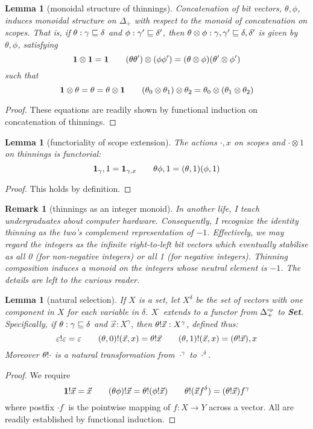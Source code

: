 \documentclass{jfp1}
\newtheorem{lemma}[theorem]{Lemma}
\newtheorem{remark}[theorem]{Remark}
\newcommand{\emp}{\varepsilon}
\newcommand{\Set}{\textbf{Set}}
\newcommand{\op}[1]{#1^{\mbox{\tiny op}}}
\begin{document}
\begin{lemma}[monoidal structure of thinnings]
  Concatenation of bit vectors, $\theta,\phi$, induces monoidal
  structure on $\Delta_+$ with respect to the monoid of concatenation
  on scopes. That is, if $\theta:\gamma\sqsubseteq\delta$ and
  $\phi:\gamma'\sqsubseteq\delta'$, then $\theta\otimes\phi :
  \gamma,\gamma'\sqsubseteq\delta,\delta'$
  is given by $\theta,\phi$, satisfying
  \[
    \mathbf{1}\otimes\mathbf{1} = \mathbf{1} \qquad
    (\theta\theta')\otimes(\phi\phi') =
     (\theta\otimes\phi)(\theta'\otimes\phi')
   \]
   such that
   \[
     \mathbf{1}\otimes\theta = \theta = \theta\otimes\mathbf{1}\qquad
     (\theta_0\otimes\theta_1)\otimes\theta_2 = \theta_0\otimes(\theta_1\otimes\theta_2)
   \]
\end{lemma}
\begin{proof}
  These equations are readily shown by functional induction on
  concatenation of thinnings.
\end{proof}

\begin{lemma}[functoriality of scope extension]
  The actions $\cdot,x$ on scopes and $\cdot\otimes1$ on thinnings is functorial:
  \[
    \mathbf{1}_\gamma,1 = \mathbf{1}_{\gamma,x}\qquad \theta\phi,1 = (\theta,1)(\phi,1)
    \]
\end{lemma}
\begin{proof}
  This holds by definition.
\end{proof}

\begin{remark}[thinnings as an integer monoid]
  In another life, I teach undergraduates about computer hardware. Consequently, I recognize the identity thinning as the two's complement representation of $-1$.
  Effectively, we may regard the integers as the infinite right-to-left bit vectors which eventually stabilise as all 0 (for non-negative integers) or all 1 (for negative integers). Thinning composition induces a monoid on the integers whose neutral element is $-1$. The details are left to the curious reader.
\end{remark}

\begin{lemma}[natural selection]
  If $X$ is a set, let $X^\delta$ be the set of vectors with one
  component in $X$ for each variable in $\delta$. $X^\cdot$ extends
  to a functor from $\op{\Delta_+}$ to \Set.
  Specifically, if $\theta:\gamma\sqsubseteq\delta$ and $\vec x:X^\gamma$,
  then $\theta!\vec x : X^\gamma$, defined thus:
  \[
    \sel\emp\emp=\emp \qquad
    \sel{(\theta,0)}{(\vec x,x)} = \sel\theta{\vec x} \qquad
    \sel{(\theta,1)}{(\vec x,x)} = (\sel\theta{\vec x}),x
  \]
  Moreover $\theta!\cdot$ is a natural transformation from
  $\cdot^\gamma$ to $\cdot^\delta$.
\end{lemma}
\begin{proof}
  We require
  \[
    \mathbf{1}!\vec x = \vec x \qquad
    (\theta\phi)!\vec x = \theta!(\phi!\vec x) \qquad
    \theta!(\vec x f^\delta) = (\theta!\vec x)f^\gamma
  \]
  where postfix $\cdot f^\cdot$ is the pointwise mapping of $f:X\to Y$ across a vector.
  All are readily established by functional induction.
\end{proof}
\end{document}
